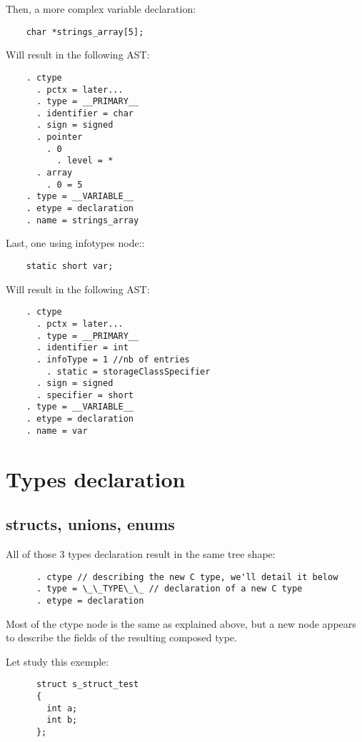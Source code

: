 \documentclass[a4paper,11pt]{report}
\begin{document}
  Then, a more complex variable declaration:
  \begin{lstlisting}
    char *strings_array[5];
  \end{lstlisting}
  
  Will result in the following AST:
  \begin{lstlisting}
    . ctype
      . pctx = later...
      . type = __PRIMARY__
      . identifier = char
      . sign = signed
      . pointer
        . 0
          . level = *
      . array
        . 0 = 5
    . type = __VARIABLE__
    . etype = declaration
    . name = strings_array
  \end{lstlisting}

  Last, one using infotypes node::
  \begin{lstlisting}
    static short var;
  \end{lstlisting}
  
  Will result in the following AST:
  \begin{lstlisting}
    . ctype
      . pctx = later...
      . type = __PRIMARY__
      . identifier = int
      . infoType = 1 //nb of entries
        . static = storageClassSpecifier
      . sign = signed
      . specifier = short
    . type = __VARIABLE__
    . etype = declaration
    . name = var
  \end{lstlisting}

  \section{Types declaration}

    \subsection{structs, unions, enums}

    All of those 3 types declaration result in the same tree shape:
    \begin{lstlisting}
      . ctype // describing the new C type, we'll detail it below
      . type = \_\_TYPE\_\_ // declaration of a new C type
      . etype = declaration
    \end{lstlisting}

    Most of the ctype node is the same as explained above, but a new node
    appears to describe the fields of the resulting composed type.

    Let study this exemple:
    \begin{lstlisting}
      struct s_struct_test
      {
        int a;
        int b;
      };
    \end{lstlisting}
\end{document}
